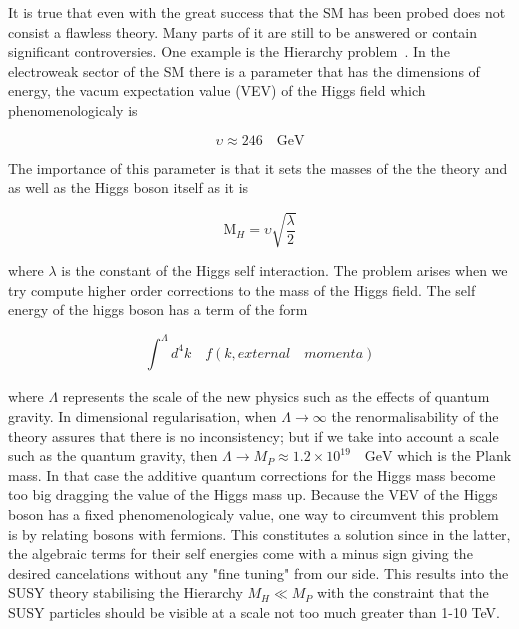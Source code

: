 \documentclass[12pt,a4paper]{report}
\begin{document}
It is true that even with the great success that the SM has been probed does not consist a flawless theory.
Many parts of it are still to be answered or contain significant controversies. One example is the Hierarchy 
problem~\cite{aitchison2005supersymmetry}. 
In the electroweak sector of the SM there is a parameter that has the dimensions of energy, the 
vacum expectation value (VEV) of the Higgs field which phenomenologicaly is 

\begin{equation}
 \upsilon \approx 246 \quad \textrm{GeV}
\end{equation}

The importance of this parameter is that it sets the masses of the the theory and as well as the Higgs boson
itself as it is

\begin{equation}
 \textrm{M}_{H} = \upsilon \sqrt{\frac{\lambda}{2}} 
\end{equation}


where $\lambda$ is the constant of the Higgs self interaction. The problem arises when we try compute higher 
order corrections to the mass of the Higgs field. The self energy of the higgs boson has a term of the form

\begin{equation}
 \int_{}^{\Lambda} d^{4}k \quad f(k,external\quad momenta)
\end{equation}

where $\Lambda$ represents the scale of the new physics such as the effects of quantum gravity. In dimensional 
regularisation, when $\Lambda \rightarrow \infty$ the renormalisability of the theory assures that there
is no inconsistency; but if we take into account a scale such as the quantum gravity, then $\Lambda \rightarrow 
M_{P} \approx 1.2\times 10^{19}\quad \textrm{GeV}$ which is the Plank mass. In that case 
the additive quantum corrections for the Higgs 
mass become too big dragging the value of the Higgs mass up. Because the VEV of the Higgs boson has a fixed 
phenomenologicaly value, one way to circumvent this problem is by relating bosons with fermions. 
This constitutes a solution since in the 
latter, the algebraic terms for their self energies come with a minus sign giving the desired cancelations 
without any "fine tuning" from our side. This results into the SUSY theory stabilising the Hierarchy $M_{H}
\ll M_{P}$ with the constraint that the SUSY particles should be visible at a scale not too much greater 
than 1-10 TeV.
\end{document}
